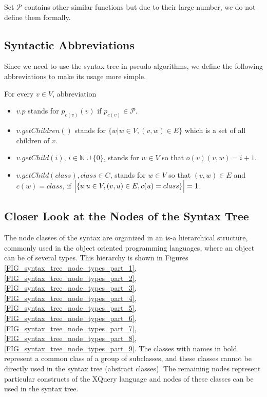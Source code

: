 Set $\mathcal{P}$ contains other similar functions but due to their large number, we do not define them formally.


\subsection{Syntactic Abbreviations}
Since we need to use the syntax tree in pseudo-algorithms, we define the following abbreviations to make its usage more simple.

For every $v \in V$, abbreviation
\begin{itemize}
\item $v.p$ stands for $p_{c(v)}(v)$ if $p_{c(v)} \in \mathcal{P}$.
\item $v.getChildren()$ stands for $\{w | w \in V, (v,w) \in E\}$ which is a set of all children of $v$.
\item $v.getChild(i)$, $i \in \mathbb{N} \cup \{0\}$, stands for $w \in V$ so that $o(v)(v,w) = i + 1$.
\item $v.getChild(class), class \in C$, stands for $w \in V$ so that $(v,w) \in E$ and $c(w) = class$, if $\Bigl | \{u | u \in V, (v,u) \in E, c(u) = class\}\Bigr | = 1$.
\end{itemize}


\subsection{Closer Look at the Nodes of the Syntax Tree}
The node classes of the syntax are organized in an is-a hierarchical structure, commonly used in the object oriented programming languages, where an object can be of several types. This hierarchy is shown in Figures \ref{FIG_syntax_tree_node_types_part_1}, \ref{FIG_syntax_tree_node_types_part_2}, \ref{FIG_syntax_tree_node_types_part_3}, \ref{FIG_syntax_tree_node_types_part_4}, \ref{FIG_syntax_tree_node_types_part_5}, \ref{FIG_syntax_tree_node_types_part_6}, \ref{FIG_syntax_tree_node_types_part_7}, \ref{FIG_syntax_tree_node_types_part_8}, \ref{FIG_syntax_tree_node_types_part_9}. The classes with names in bold represent a common class of a group of subclasses, and these classes cannot be directly used in the syntax tree (abstract classes). The remaining nodes represent particular constructs of the XQuery language and nodes of these classes can be used in the syntax tree. 


